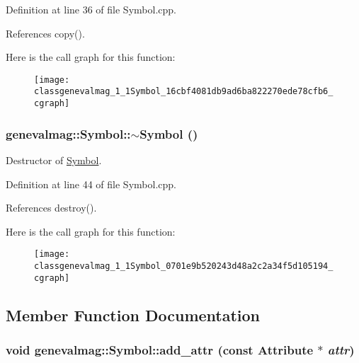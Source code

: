 Definition at line 36 of file Symbol.cpp.

References copy().

Here is the call graph for this function:\nopagebreak
\begin{figure}[H]
\begin{center}
\leavevmode
\texttt{[image: classgenevalmag\_1\_1Symbol\_16cbf4081db9ad6ba822270ede78cfb6\_cgraph]}
\end{center}
\end{figure}
\hypertarget{classgenevalmag_1_1Symbol_0701e9b520243d48a2c2a34f5d105194}{
\subsubsection[{$\sim$Symbol}]{\setlength{\rightskip}{0pt plus 5cm}genevalmag::Symbol::$\sim$Symbol ()}}
\label{classgenevalmag_1_1Symbol_0701e9b520243d48a2c2a34f5d105194}


Destructor of \hyperlink{classgenevalmag_1_1Symbol}{Symbol}. 

Definition at line 44 of file Symbol.cpp.

References destroy().

Here is the call graph for this function:\nopagebreak
\begin{figure}[H]
\begin{center}
\leavevmode
\texttt{[image: classgenevalmag\_1\_1Symbol\_0701e9b520243d48a2c2a34f5d105194\_cgraph]}
\end{center}
\end{figure}


\subsection{Member Function Documentation}
\hypertarget{classgenevalmag_1_1Symbol_41ceb415014d2cfbb5976c3fd2bbf35f}{
\subsubsection[{add\_\-attr}]{\setlength{\rightskip}{0pt plus 5cm}void genevalmag::Symbol::add\_\-attr (const {\bf Attribute} $\ast$ {\em attr})}}
\label{classgenevalmag_1_1Symbol_41ceb415014d2cfbb5976c3fd2bbf35f}


